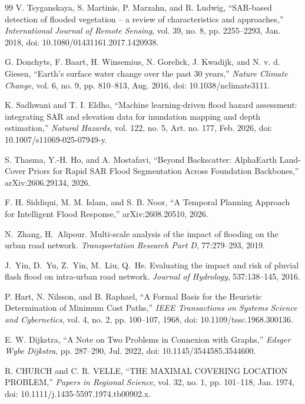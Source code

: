 \begin{thebibliography}{99}
V. Tsyganskaya, S. Martinis, P. Marzahn, and R. Ludwig, ``SAR-based detection of flooded vegetation -- a review of characteristics and approaches,'' \emph{International Journal of Remote Sensing}, vol. 39, no. 8, pp. 2255--2293, Jan. 2018, doi: 10.1080/01431161.2017.1420938.

G. Donchyts, F. Baart, H. Winsemius, N. Gorelick, J. Kwadijk, and N. v. d. Giesen, ``Earth's surface water change over the past 30 years,'' \emph{Nature Climate Change}, vol. 6, no. 9, pp. 810--813, Aug. 2016, doi: 10.1038/nclimate3111.

K. Sadhwani and T. I. Eldho, ``Machine learning-driven flood hazard assessment: integrating SAR and elevation data for inundation mapping and depth estimation,'' \emph{Natural Hazards}, vol. 122, no. 5, Art. no. 177, Feb. 2026, doi: 10.1007/s11069-025-07949-y.

S. Thasma, Y.-H. Ho, and A. Mostafavi, ``Beyond Backscatter: AlphaEarth Land-Cover Priors for Rapid SAR Flood Segmentation Across Foundation Backbones,'' arXiv:2606.29134, 2026.

F. H. Siddiqui, M. M. Islam, and S. B. Noor, ``A Temporal Planning Approach for Intelligent Flood Response,'' arXiv:2608.20510, 2026.

N.~Zhang, H.~Alipour. Multi-scale analysis of the impact of flooding on the urban road network. \emph{Transportation Research Part D}, 77:279--293, 2019.

J.~Yin, D.~Yu, Z.~Yin, M.~Liu, Q.~He. Evaluating the impact and risk of pluvial flash flood on intra-urban road network. \emph{Journal of Hydrology}, 537:138--145, 2016.

P. Hart, N. Nilsson, and B. Raphael, ``A Formal Basis for the Heuristic Determination of Minimum Cost Paths,'' \emph{IEEE Transactions on Systems Science and Cybernetics}, vol. 4, no. 2, pp. 100--107, 1968, doi: 10.1109/tssc.1968.300136.

E. W. Dijkstra, ``A Note on Two Problems in Connexion with Graphs,'' \emph{Edsger Wybe Dijkstra}, pp. 287--290, Jul. 2022, doi: 10.1145/3544585.3544600.

R. CHURCH and C. R. VELLE, ``THE MAXIMAL COVERING LOCATION PROBLEM,'' \emph{Papers in Regional Science}, vol. 32, no. 1, pp. 101--118, Jan. 1974, doi: 10.1111/j.1435-5597.1974.tb00902.x.


\end{thebibliography}
